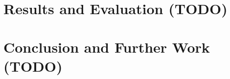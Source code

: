 \documentclass[journal]{IEEEtran}
\begin{document}
\section{Results and Evaluation (TODO)}
\section{Conclusion and Further Work (TODO)}

\clearpage %


\end{document}
